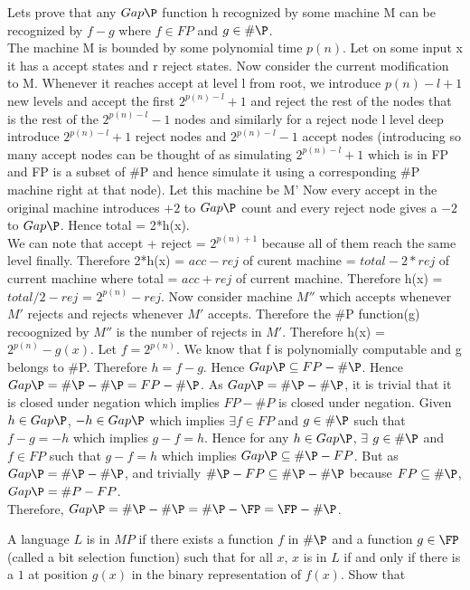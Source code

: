 \documentclass[12pt]{exam}
\begin{document}
\begin{questions}
\begin{solution}
\begin{parts}
Lets prove that any $Gap\P$ function h recognized by some
machine M can be recognized by $f-g$ where $f \in FP$ and $g \in \#\P$.\\
The machine M is bounded by some polynomial time $p(n)$.
Let on some input x it has a accept states and r reject states.
Now consider the current modification to M. Whenever it reaches accept
at level l from root, we introduce $p(n)-l+1$ new levels
and accept the first $2^{p(n)-l}+1$ and reject the rest of the nodes
that is the rest of the $2^{p(n)-l}-1$ nodes and similarly for
a reject node l level deep introduce $2^{p(n)-l}+1$ reject nodes
and $2^{p(n)-l}-1$ accept nodes (introducing so many accept nodes
can be thought of as simulating $2^{p(n)-l}+1$ which is in FP and FP is a
subset of \#P and hence simulate it using a corresponding \#P machine right
at that node). Let this machine be M'
Now every accept in the original machine introduces
$+2$ to $Gap\P$ count and every reject node gives
a $-2$ to $Gap\P$. Hence total = 2*h(x).\\
We can note that accept + reject = $2^{p(n)+1}$
because all of them reach the same level finally.
Therefore 2*h(x) = $acc - rej$ of curent machine = $total - 2*rej$
of current machine where total = $acc + rej$ of current machine.
Therefore h(x) = $total/2 - rej$ = $2^{p(n)} - rej$. Now consider
machine $M''$ which accepts whenever $M'$ rejects and rejects
whenever $M'$ accepts. Therefore the \#P function(g) recoognized
by $M''$ is the number of rejects in $M'$. Therefore
h(x) = $2^{p(n)} - g(x)$. Let $ f = 2^{p(n)}$. We know that
f is polynomially computable and g belongs to \#P.
Therefore $h = f - g$. Hence $Gap\P \subseteq FP - \#\P$.
Hence $Gap\P = \#\P - \#\P = FP - \#\P$. As $Gap\P = \#\P - \#\P$,
it is trivial that it is closed under negation which implies
$FP - \#P$ is closed under negation. Given $h \in Gap\P$,
$-h \in Gap\P$ which implies $\exists f \in FP$ and $g \in \#\P$
such that $f-g = -h$ which implies $g-f = h$. Hence for any $h \in Gap\P$,
$\exists$ $g \in \#\P$ and $f \in FP$ such that $g-f = h$ which implies
$Gap\P \subseteq \#\P-FP$. But as $Gap\P = \#\P - \#\P$, and trivially
$\#\P - FP \subseteq \#\P - \#\P$ because $FP \subseteq \#\P$,
$Gap\P = \#P - FP$.\\
Therefore, $Gap\P = \#\P - \#\P = \#\P - \FP = \FP - \#\P$.

\end{parts}
\end{solution}
\question[20]
A language $L$ is in $MP$ if there exists a function $f$ in $\#\P$ and a function
$g \in \FP$ (called a bit selection function) such that for all $x$, $x$ is in $L$ if and only if there is
a $1$ at position $g(x)$ in the binary representation of $f(x)$. Show that
\begin{parts}

\end{parts}
\end{questions}
\end{document}
